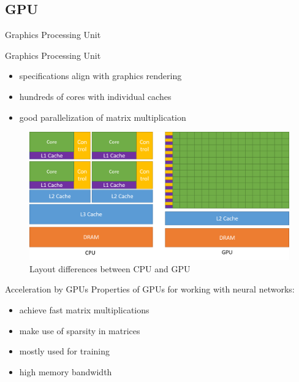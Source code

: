 \documentclass[en]{sdqbeamer}
\begin{document}
	\subsection{GPU}
	\begin{frame}{Graphics Processing Unit}
		\begin{minipage}[b]{0.45\paperwidth}
			Graphics Processing Unit
			\begin{itemize}
				\item specifications align with graphics rendering
				\item hundreds of cores with individual caches
				\item good parallelization of matrix multiplication
			\end{itemize}
		\end{minipage}
		\begin{minipage}{0.45\paperwidth}
			\begin{figure}
				\includegraphics[width= 0.47\paperwidth, right]{pictures/intel_comparison.png}
				\caption{Layout differences between CPU and GPU \cite{intelpic_comparison}}
			\end{figure}
		\end{minipage}
	\end{frame}
	
	\begin{frame}{Acceleration by GPUs}
		Properties of GPUs for working with neural networks\cite{nvidiav100}:
		\begin{itemize}
			\item achieve fast matrix multiplications
			\item make use of sparsity in matrices
			\item mostly used for training
			\item high memory bandwidth
		\end{itemize}
	\end{frame}
	
\end{document}
